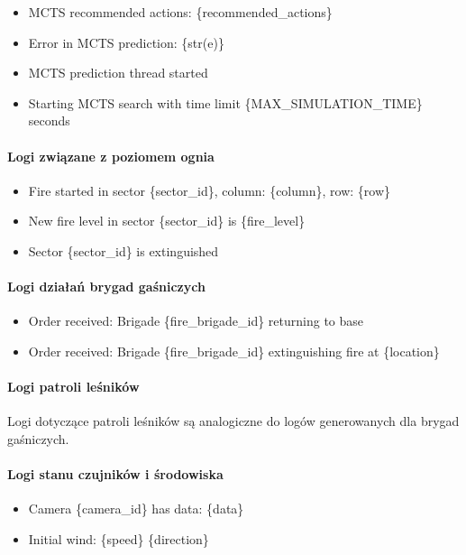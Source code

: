 \begin{itemize}
    \item MCTS recommended actions: \{recommended\_actions\}
    \item Error in MCTS prediction: \{str(e)\}
    \item MCTS prediction thread started
    \item Starting MCTS search with time limit \{MAX\_SIMULATION\_TIME\} seconds
\end{itemize}

\paragraph{Logi związane z poziomem ognia}

\begin{itemize}
    \item Fire started in sector \{sector\_id\}, column: \{column\}, row: \{row\}
    \item New fire level in sector \{sector\_id\} is \{fire\_level\}
    \item Sector \{sector\_id\} is extinguished
\end{itemize}

\paragraph{Logi działań brygad gaśniczych}

\begin{itemize}
    \item Order received: Brigade \{fire\_brigade\_id\} returning to base
    \item Order received: Brigade \{fire\_brigade\_id\} extinguishing fire at \{location\}
\end{itemize}

\paragraph{Logi patroli leśników}

Logi dotyczące patroli leśników są analogiczne do logów generowanych dla brygad gaśniczych.

\paragraph{Logi stanu czujników i środowiska}

\begin{itemize}
    \item Camera \{camera\_id\} has data: \{data\}
    \item Initial wind: \{speed\} \{direction\}
\end{itemize}

